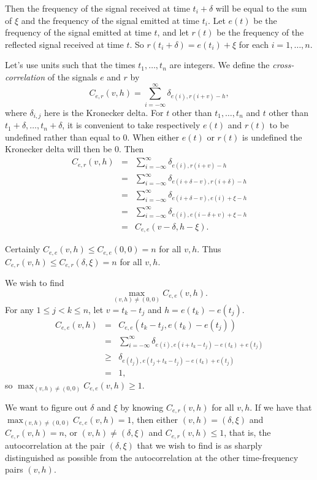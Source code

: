 \documentclass[10pt]{article}
\begin{document}
Then the frequency of the signal received at time $t_i+\delta$ 
will be equal to the sum of $\xi$ and
the frequency of the signal emitted at time $t_i$.
Let $e(t)$ be the frequency of the signal emitted at time $t$, and 
let $r(t)$ be the frequency of the reflected signal received at time $t$.
So $r(t_i+\delta)=e(t_i)+\xi$ for each $i=1,\ldots,n$.

Let's use units such that the times $t_1,\ldots,t_n$ are integers.
We define the {\em cross-correlation} of the signals $e$ and $r$
by
\[
C_{e,r}(v,h)=\sum_{i=-\infty}^\infty \delta_{e(i),r(i+v)-h},
\]
where $\delta_{i,j}$ here is the Kronecker delta.
For $t$ other than $t_1,\ldots,t_n$ and $t$ other than
$t_1+\delta,\ldots,t_n+\delta$,
it is convenient to take respectively $e(t)$ and $r(t)$ to be undefined
rather than equal to 0. When either $e(t)$ or $r(t)$ is undefined
the Kronecker delta will then be 0.
Then 
\begin{eqnarray*}
C_{e,r}(v,h)&=&\sum_{i=-\infty}^\infty \delta_{e(i),r(i+v)-h}\\
&=&\sum_{i=-\infty}^\infty \delta_{e(i+\delta-v),r(i+\delta)-h}\\
&=&\sum_{i=-\infty}^\infty \delta_{e(i+\delta-v),e(i)+\xi-h}\\
&=&\sum_{i=-\infty}^\infty \delta_{e(i),e(i-\delta+v)+\xi-h}\\
&=&C_{e,e}(v-\delta,h-\xi).
\end{eqnarray*}

Certainly $C_{e,e}(v,h) \leq C_{e,e}(0,0)=n$ for all $v,h$. 
Thus
$C_{e,r}(v,h) \leq C_{e,r}(\delta,\xi)=n$ for all $v,h$.

We wish to find
\[
\max_{(v,h) \neq (0,0)} C_{e,e}(v,h).
\]
For any $1 \leq j<k \leq n$, let $v=t_k-t_j$ and $h=e(t_k)-e(t_j)$.
\begin{eqnarray*}
C_{e,e}(v,h)&=&C_{e,e}(t_k-t_j,e(t_k)-e(t_j))\\
&=&\sum_{i=-\infty}^\infty \delta_{e(i),e(i+t_k-t_j)-e(t_k)+e(t_j)}\\
&\geq&\delta_{e(t_j),e(t_j+t_k-t_j)-e(t_k)+e(t_j)}\\
&=&1,
\end{eqnarray*}
so $\max_{(v,h) \neq (0,0)} C_{e,e}(v,h) \geq 1$.

We want to figure out $\delta$ and $\xi$ by knowing $C_{e,r}(v,h)$ for
all $v,h$.
If we have that $\max_{(v,h) \neq (0,0)} C_{e,e}(v,h)=1$, then either
$(v,h)=(\delta,\xi)$ and $C_{e,r}(v,h)=n$,
or $(v,h) \neq (\delta,\xi)$ and 
$C_{e,r}(v,h) \leq 1$, that is, the autocorrelation at the pair $(\delta,
\xi)$ that we wish to find is as sharply distinguished as possible
from the autocorrelation
at the other time-frequency pairs $(v,h)$.
\end{document}

